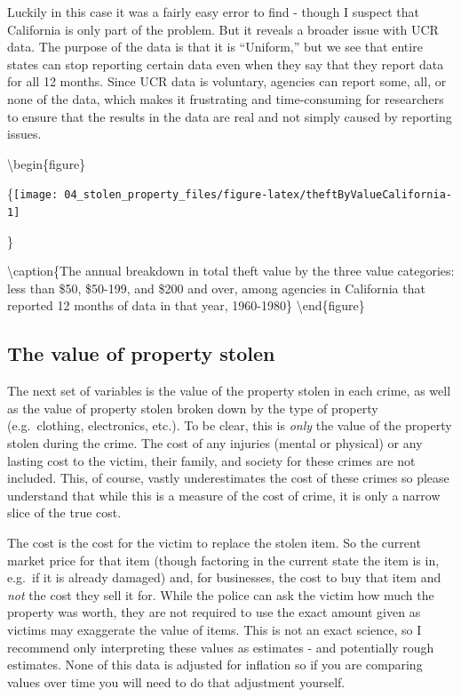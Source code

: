 \documentclass[
]{krantz}
\begin{document}
Luckily in this case it was a fairly easy error to find -
though I suspect that California is only part of the
problem. But it reveals a broader issue with UCR data. The
purpose of the data is that it is ``Uniform,'' but we see
that entire states can stop reporting certain data even when
they say that they report data for all 12 months. Since UCR
data is voluntary, agencies can report some, all, or none of
the data, which makes it frustrating and time-consuming for
researchers to ensure that the results in the data are real
and not simply caused by reporting issues.

\textbackslash begin\{figure\}

\{\centering \texttt{[image: 04\_stolen\_property\_files/figure-latex/theftByValueCalifornia-1]}

\}

\textbackslash caption\{The annual breakdown in total theft
value by the three value categories: less than \$50,
\$50-199, and \$200 and over, among agencies in California
that reported 12 months of data in that year,
1960-1980\}\label{fig:theftByValueCalifornia}
\textbackslash end\{figure\}

\subsection{The value of property
stolen}\label{the-value-of-property-stolen}

The next set of variables is the value of the property
stolen in each crime, as well as the value of property
stolen broken down by the type of property (e.g.~clothing,
electronics, etc.). To be clear, this is \emph{only} the
value of the property stolen during the crime. The cost of
any injuries (mental or physical) or any lasting cost to the
victim, their family, and society for these crimes are not
included. This, of course, vastly underestimates the cost of
these crimes so please understand that while this is a
measure of the cost of crime, it is only a narrow slice of
the true cost.

The cost is the cost for the victim to replace the stolen
item. So the current market price for that item (though
factoring in the current state the item is in, e.g.~if it is
already damaged) and, for businesses, the cost to buy that
item and \emph{not} the cost they sell it for. While the
police can ask the victim how much the property was worth,
they are not required to use the exact amount given as
victims may exaggerate the value of items. This is not an
exact science, so I recommend only interpreting these values
as estimates - and potentially rough estimates. None of this
data is adjusted for inflation so if you are comparing
values over time you will need to do that adjustment
yourself.
\end{document}
